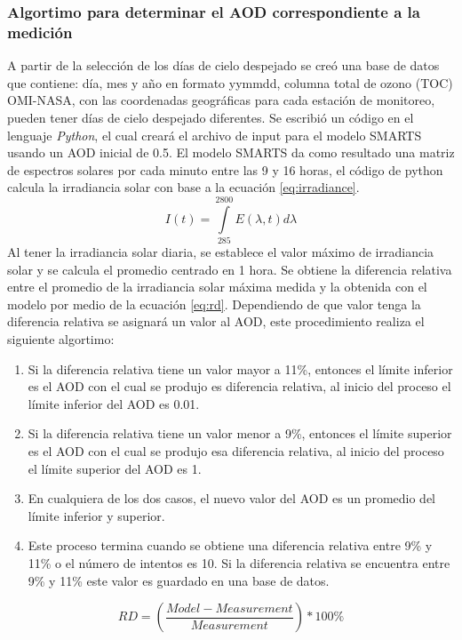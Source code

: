 \subsubsection{Algortimo para determinar el AOD correspondiente a la medición}
A partir de la selección de los días de cielo despejado se creó una base de datos que contiene: día, mes y año en formato yymmdd, columna total de ozono (TOC) OMI-NASA, con las coordenadas geográficas para cada estación de monitoreo, pueden tener días de cielo despejado diferentes. Se escribió un código en el lenguaje \textit{Python}, el cual creará el archivo de input para el modelo SMARTS usando un AOD inicial de 0.5. El modelo SMARTS da como resultado una matriz de espectros solares por cada  minuto entre las 9 y 16 horas, el código de python calcula la irradiancia solar con base a la ecuación \ref{eq:irradiance}.
\begin{equation}
    I(t) = \int\limits_{285}^{2800} E(\lambda,t) d\lambda
    \label{eq:irradiance}
\end{equation}
Al tener la irradiancia solar diaria, se establece el valor máximo de irradiancia solar y se calcula el promedio centrado en 1 hora. Se obtiene la diferencia relativa entre el promedio de la irradiancia solar máxima medida y la obtenida con el modelo por medio de la ecuación \ref{eq:rd}. Dependiendo de que valor tenga la diferencia relativa se asignará un valor al AOD, este procedimiento realiza el siguiente algortimo:
\begin{enumerate}
    \item Si la diferencia relativa tiene un valor mayor a 11\%, entonces el límite inferior es el AOD con el cual se produjo es diferencia relativa, al inicio del proceso el límite inferior del AOD es 0.01.
    \item Si la diferencia relativa tiene un valor menor a 9\%, entonces el límite superior es el AOD con el cual se produjo esa diferencia relativa, al inicio del proceso el límite superior del AOD es 1.
    \item En cualquiera de los dos casos, el nuevo valor del AOD es un promedio del límite inferior y superior.
    \item Este proceso termina cuando se obtiene una diferencia relativa entre 9\% y 11\% o el número de intentos es 10. Si la diferencia relativa se encuentra entre 9\% y 11\% este valor es guardado en una base de datos.
\end{enumerate}
\begin{equation}
    RD = \left(\frac{Model-Measurement}{Measurement}\right)*100\%
    \label{eq:rd}
\end{equation}
